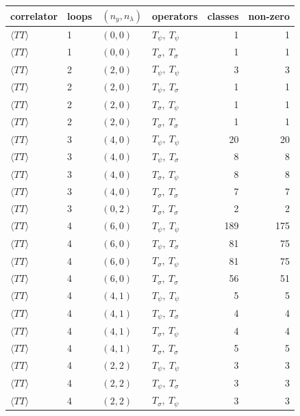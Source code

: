 \begin{center}\small
\begin{longtable}{llllrr}
\toprule
correlator & loops & $(n_y,n_\lambda)$ & operators & classes & non-zero\\ \midrule
\endhead
$\langle TT\rangle$ & 1 & $(0,0)$ & $T_\psi,\ T_\psi$ & 1 & 1\\
$\langle TT\rangle$ & 1 & $(0,0)$ & $T_\sigma,\ T_\sigma$ & 1 & 1\\
$\langle TT\rangle$ & 2 & $(2,0)$ & $T_\psi,\ T_\psi$ & 3 & 3\\
$\langle TT\rangle$ & 2 & $(2,0)$ & $T_\psi,\ T_\sigma$ & 1 & 1\\
$\langle TT\rangle$ & 2 & $(2,0)$ & $T_\sigma,\ T_\psi$ & 1 & 1\\
$\langle TT\rangle$ & 2 & $(2,0)$ & $T_\sigma,\ T_\sigma$ & 1 & 1\\
$\langle TT\rangle$ & 3 & $(4,0)$ & $T_\psi,\ T_\psi$ & 20 & 20\\
$\langle TT\rangle$ & 3 & $(4,0)$ & $T_\psi,\ T_\sigma$ & 8 & 8\\
$\langle TT\rangle$ & 3 & $(4,0)$ & $T_\sigma,\ T_\psi$ & 8 & 8\\
$\langle TT\rangle$ & 3 & $(4,0)$ & $T_\sigma,\ T_\sigma$ & 7 & 7\\
$\langle TT\rangle$ & 3 & $(0,2)$ & $T_\sigma,\ T_\sigma$ & 2 & 2\\
$\langle TT\rangle$ & 4 & $(6,0)$ & $T_\psi,\ T_\psi$ & 189 & 175\\
$\langle TT\rangle$ & 4 & $(6,0)$ & $T_\psi,\ T_\sigma$ & 81 & 75\\
$\langle TT\rangle$ & 4 & $(6,0)$ & $T_\sigma,\ T_\psi$ & 81 & 75\\
$\langle TT\rangle$ & 4 & $(6,0)$ & $T_\sigma,\ T_\sigma$ & 56 & 51\\
$\langle TT\rangle$ & 4 & $(4,1)$ & $T_\psi,\ T_\psi$ & 5 & 5\\
$\langle TT\rangle$ & 4 & $(4,1)$ & $T_\psi,\ T_\sigma$ & 4 & 4\\
$\langle TT\rangle$ & 4 & $(4,1)$ & $T_\sigma,\ T_\psi$ & 4 & 4\\
$\langle TT\rangle$ & 4 & $(4,1)$ & $T_\sigma,\ T_\sigma$ & 5 & 5\\
$\langle TT\rangle$ & 4 & $(2,2)$ & $T_\psi,\ T_\psi$ & 3 & 3\\
$\langle TT\rangle$ & 4 & $(2,2)$ & $T_\psi,\ T_\sigma$ & 3 & 3\\
$\langle TT\rangle$ & 4 & $(2,2)$ & $T_\sigma,\ T_\psi$ & 3 & 3\\

\end{longtable}
\end{center}

